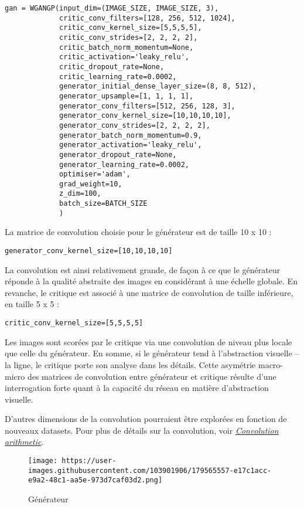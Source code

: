 \documentclass[
]{article}
\begin{document}
\begin{verbatim}
gan = WGANGP(input_dim=(IMAGE_SIZE, IMAGE_SIZE, 3), 
             critic_conv_filters=[128, 256, 512, 1024],
             critic_conv_kernel_size=[5,5,5,5], 
             critic_conv_strides=[2, 2, 2, 2], 
             critic_batch_norm_momentum=None, 
             critic_activation='leaky_relu', 
             critic_dropout_rate=None, 
             critic_learning_rate=0.0002, 
             generator_initial_dense_layer_size=(8, 8, 512), 
             generator_upsample=[1, 1, 1, 1], 
             generator_conv_filters=[512, 256, 128, 3], 
             generator_conv_kernel_size=[10,10,10,10], 
             generator_conv_strides=[2, 2, 2, 2], 
             generator_batch_norm_momentum=0.9, 
             generator_activation='leaky_relu', 
             generator_dropout_rate=None, 
             generator_learning_rate=0.0002, 
             optimiser='adam', 
             grad_weight=10, 
             z_dim=100, 
             batch_size=BATCH_SIZE
             )
\end{verbatim}

La matrice de convolution choisie pour le générateur est de taille 10 x 10 :

\texttt{generator\_conv\_kernel\_size={[}10,10,10,10{]}}

La convolution est ainsi relativement grande, de façon à ce que le générateur réponde à la qualité abstraite des images en considérant à une échelle globale. En revanche, le critique est associé à une matrice de convolution de taille inférieure, en taille 5 x 5 :

\texttt{critic\_conv\_kernel\_size={[}5,5,5,5{]}}

Les images sont scorées par le critique via une convolution de niveau plus locale que celle du générateur. En somme, si le générateur tend à l'abstraction visuelle -- la ligne, le critique porte son analyse dans les détails. Cette asymétrie macro-micro des matrices de convolution entre générateur et critique résulte d'une interrogation forte quant à la capacité du réseau en matière d'abstraction visuelle.

D'autres dimensions de la convolution pourraient être explorées en fonction de nouveaux datasets. Pour plus de détails sur la convolution, voir \emph{\href{https://github.com/vdumoulin/conv_arithmetic}{Convolution arithmetic}}.

\begin{figure}
\centering
\texttt{[image: https://user-images.githubusercontent.com/103901906/179565557-e17c1acc-e9a2-48c1-aa5e-973d7caf03d2.png]}
\caption{Générateur}
\end{figure}
\end{document}
